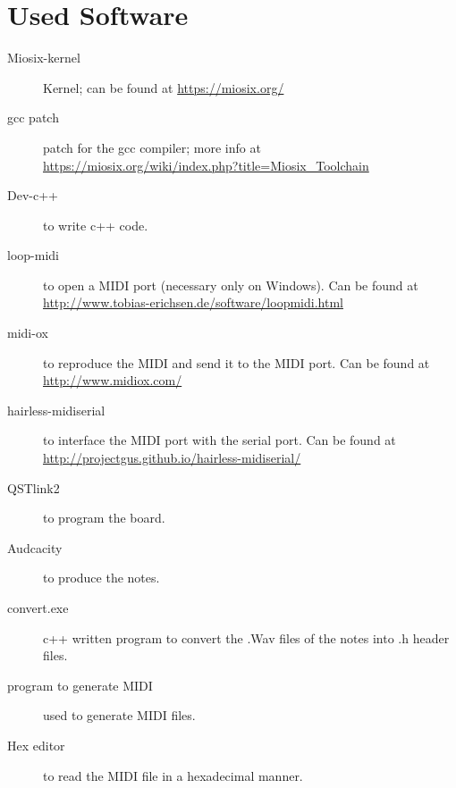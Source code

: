 \documentclass[12pt]{article}
\begin{document}
\section{Used Software} \label{sec:used}
\begin{description} 
	\item[Miosix-kernel] Kernel; can be found at \url{https://miosix.org/}
	\item[gcc patch] patch for the gcc compiler; more info at \url{https://miosix.org/wiki/index.php?title=Miosix_Toolchain}
	\item[Dev-c++] to write c++  code.
	\item[loop-midi] to open a MIDI port (necessary only on Windows). Can be found at \url{http://www.tobias-erichsen.de/software/loopmidi.html}
	\item[midi-ox] to reproduce the MIDI and send it to the MIDI port. Can be found at \url{http://www.midiox.com/}
	\item[hairless-midiserial] to interface the MIDI port with the serial port. Can be found at \url{http://projectgus.github.io/hairless-midiserial/}
	\item[QSTlink2] to program the board.
	\item[Audcacity] to produce the notes.
	\item[convert.exe] c++ written program to convert the .Wav files  of the notes into .h header files.
	\item[program to generate MIDI] used to generate MIDI files.
	\item[Hex editor] to read the MIDI file in a hexadecimal manner.
\end{description}
\end{document}
